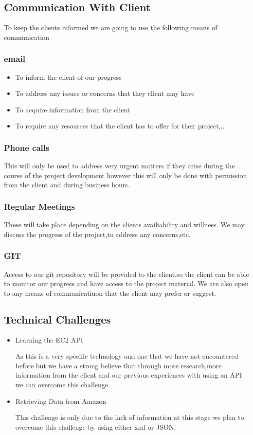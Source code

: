 \documentclass[a4paper,12pt]{article}
\begin{document}
\subsection{Communication With Client}
To keep the clients informed we are going to use the following means of communication
\subsubsection{email}
\begin{itemize}
\item To inform the client of our progress
\item To address any issues or concerns that they client may have
\item To acquire information from the client
\item To require any resources that the client has to offer for their project,..
\end{itemize}
\subsubsection{Phone calls}
This will only be used to address very urgent matters if they arise during the course of the project development
however this will only be done with permission from the client and during business hours.
\subsubsection{Regular Meetings}
These will take place depending on the clients availiability and willness.
We may discuss the progress of the project,to address any concerns,etc.
\subsubsection{GIT}
Access to our git repository will be provided to the client,so the client can be able to monitor
our progress and have access to the project material.
We are also open to any means of communicatiuon that the client may prefer or suggest.
\subsection{Technical Challenges}
\begin{itemize}
\item Learning the EC2 API 

As this is a very specific technology and one that we have not encountered before but we have a strong believe that 
through more research,more information from the client and our previous experiences with using an API we can overcome this challenge.

\item Retrieving Data from Amazon

This challenge is only due to the lack of information at this stage we plan to overcome this challenge by using either xml or JSON.
\end{itemize}
\end{document}
